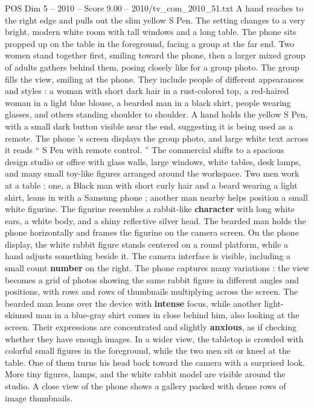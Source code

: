 \begin{textsample}{POS Dim 5 – 2010 – Score 9.00 – 2010/tv\_com\_2010\_51.txt}
A hand reaches to the right edge and pulls out the slim yellow S Pen.
The setting changes to a very bright, modern white room with tall windows and a long table.
The phone sits propped up on the table in the foreground, facing a group at the far end.
Two women stand together first, smiling toward the phone, then a larger mixed group of adults gathers behind them, posing closely like for a group photo.
The group fills the view, smiling at the phone.
They include people of different appearances and styles : a woman with short dark hair in a rust-colored top, a red-haired woman in a light blue blouse, a bearded man in a black shirt, people wearing glasses, and others standing shoulder to shoulder.
A hand holds the yellow S Pen, with a small dark button visible near the end, suggesting it is being used as a remote.
The phone ’s screen displays the group photo, and large white text across it reads “ S Pen with remote control. ” The commercial shifts to a spacious design studio or office with glass walls, large windows, white tables, desk lamps, and many small toy-like figures arranged around the workspace.
Two men work at a table : one, a Black man with short curly hair and a beard wearing a light shirt, leans in with a Samsung phone ; another man nearby helps position a small white figurine.
The figurine resembles a rabbit-like \textbf{character} with long white ears, a white body, and a shiny reflective silver head.
The bearded man holds the phone horizontally and frames the figurine on the camera screen.
On the phone display, the white rabbit figure stands centered on a round platform, while a hand adjusts something beside it.
The camera interface is visible, including a small count \textbf{number} on the right.
The phone captures many variations : the view becomes a grid of photos showing the same rabbit figure in different angles and positions, with rows and rows of thumbnails multiplying across the screen.
The bearded man leans over the device with \textbf{intense} focus, while another light-skinned man in a blue-gray shirt comes in close behind him, also looking at the screen.
Their expressions are concentrated and slightly \textbf{anxious}, as if checking whether they have enough images.
In a wider view, the tabletop is crowded with colorful small figures in the foreground, while the two men sit or kneel at the table.
One of them turns his head back toward the camera with a surprised look.
More tiny figures, lamps, and the white rabbit model are visible around the studio.
A close view of the phone shows a gallery packed with dense rows of image thumbnails.

\end{textsample}
